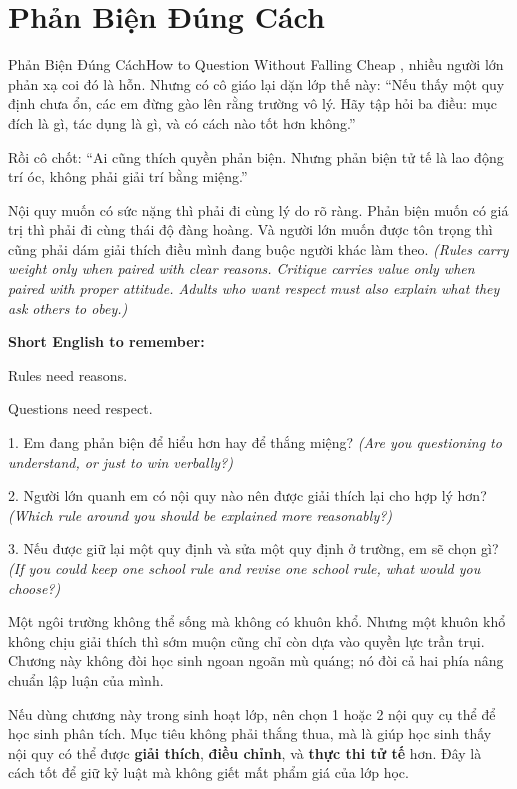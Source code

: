 \section{Phản Biện Đúng Cách}
\begin{truyen}{Phản Biện Đúng Cách}{How to Question Without Falling Cheap}
, nhiều người lớn phản xạ coi đó là hỗn. Nhưng có cô giáo lại dặn lớp thế này: ``Nếu thấy một quy định chưa ổn, các em đừng gào lên rằng trường vô lý. Hãy tập hỏi ba điều: mục đích là gì, tác dụng là gì, và có cách nào tốt hơn không.''

Rồi cô chốt: ``Ai cũng thích quyền phản biện. Nhưng phản biện tử tế là lao động trí óc, không phải giải trí bằng miệng.''
\end{truyen}

\begin{baihoc}
Nội quy muốn có sức nặng thì phải đi cùng lý do rõ ràng. Phản biện muốn có giá trị thì phải đi cùng thái độ đàng hoàng. Và người lớn muốn được tôn trọng thì cũng phải dám giải thích điều mình đang buộc người khác làm theo.
\textit{(Rules carry weight only when paired with clear reasons. Critique carries value only when paired with proper attitude. Adults who want respect must also explain what they ask others to obey.)}
\end{baihoc}

\begin{ghinhoanh}
\textbf{Short English to remember:}

Rules need reasons.

Questions need respect.
\end{ghinhoanh}

\begin{tuhocnhanh}
1. Em đang phản biện để hiểu hơn hay để thắng miệng? \textit{(Are you questioning to understand, or just to win verbally?)}

2. Người lớn quanh em có nội quy nào nên được giải thích lại cho hợp lý hơn? \textit{(Which rule around you should be explained more reasonably?)}

3. Nếu được giữ lại một quy định và sửa một quy định ở trường, em sẽ chọn gì? \textit{(If you could keep one school rule and revise one school rule, what would you choose?)}
\end{tuhocnhanh}

\begin{tongketchuong}
Một ngôi trường không thể sống mà không có khuôn khổ. Nhưng một khuôn khổ không chịu giải thích thì sớm muộn cũng chỉ còn dựa vào quyền lực trần trụi. Chương này không đòi học sinh ngoan ngoãn mù quáng; nó đòi cả hai phía nâng chuẩn lập luận của mình.
\end{tongketchuong}

\begin{goigiaovien}
Nếu dùng chương này trong sinh hoạt lớp, nên chọn 1 hoặc 2 nội quy cụ thể để học sinh phân tích. Mục tiêu không phải thắng thua, mà là giúp học sinh thấy nội quy có thể được \textbf{giải thích}, \textbf{điều chỉnh}, và \textbf{thực thi tử tế} hơn. Đây là cách tốt để giữ kỷ luật mà không giết mất phẩm giá của lớp học.
\end{goigiaovien}

\ngancach